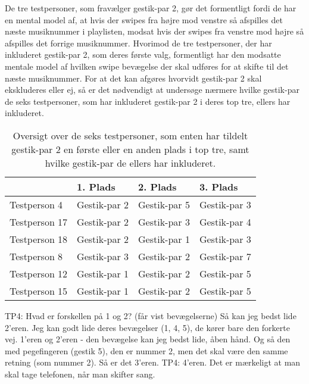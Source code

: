De tre testpersoner, som fravælger gestik-par 2, gør det formentligt fordi de har en mental model af, at hvis der swipes fra højre mod venstre så afspilles det næste musiknummer i playlisten, modsat hvis der swipes fra venstre mod højre så afspilles det forrige musiknummer. Hvorimod de tre testpersoner, der har inkluderet gestik-par 2, som deres første valg, formentligt har den modsatte mentale model af hvilken swipe bevægelse der skal udføres for at skifte til det næste musiknummer. For at det kan afgøres hvorvidt gestik-par 2 skal ekskluderes eller ej, så er det nødvendigt at undersøge nærmere hvilke gestik-par de seks testpersoner, som har inkluderet gestik-par 2 i deres top tre, ellers har inkluderet. 
%
\begin{table}[H]
	\centering
	\begin{tabular}{ | p{3cm} | p{3cm} | p{3cm} | p{3cm} |}
	\hline
		 & 1. Plads & 2. Plads & 3. Plads \\ \hline
		Testperson 4 & Gestik-par 2 & Gestik-par 5 & Gestik-par 3 \\ \hline
		Testperson 17 & Gestik-par 2 & Gestik-par 3 & Gestik-par 4 \\ \hline
		Testperson 18 & Gestik-par 2 & Gestik-par 1 & Gestik-par 3 \\ \hline
		Testperson 8 & Gestik-par 3 & Gestik-par 2 & Gestik-par 7 \\ \hline
		Testperson 12 & Gestik-par 1 & Gestik-par 2 & Gestik-par 5\\ \hline
		Testperson 15 & Gestik-par 1 & Gestik-par 2 & Gestik-par 5 \\ \hline
	\end{tabular}
	\caption{Oversigt over de seks testpersoner, som enten har tildelt gestik-par 2 en første eller en anden plads i top tre, samt hvilke gestik-par de ellers har inkluderet.}
	\label{tab:GestikPar2ITopTre}
\end{table}
\noindent
%


TP4: Hvad er forskellen på 1 og 2? (får vist bevægelserne) Så kan jeg bedst lide 2’eren. Jeg kan godt lide deres bevægelser (1, 4, 5), de kører bare den forkerte vej. 1’eren og 2’eren - den bevægelse kan jeg bedst lide, åben hånd. Og så den med pegefingeren (gestik 5), den er nummer 2, men det skal være den samme retning (som nummer 2). Så er det 3’eren. 
TP4: 4’eren. Det er mærkeligt at man skal tage telefonen, når man skifter sang. 


